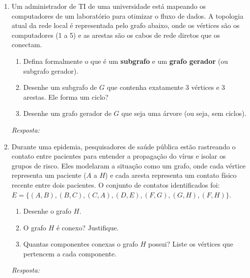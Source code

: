 \documentclass[12pt]{article}
\newcommand{\quadro}[1]{\vspace{0.2cm}\begin{tcolorbox}[colback=white, colframe=black, height=#1, boxrule=0.5pt, arc=0pt] \textit{Resposta:} \end{tcolorbox}}
\begin{document}
\begin{enumerate}[label=\arabic*), leftmargin=1.5cm, itemsep=0.8cm]

\item Um administrador de TI de uma universidade está mapeando os computadores de um laboratório para otimizar o fluxo de dados. A topologia atual da rede local é representada pelo grafo abaixo, onde os vértices são os computadores (1 a 5) e as arestas são os cabos de rede diretos que os conectam.
\begin{center}
\end{center}
\begin{enumerate}[label=\alph*)]
    \item Defina formalmente o que é um \textbf{subgrafo} e um \textbf{grafo gerador} (ou subgrafo gerador).
    \item Desenhe um subgrafo de $G$ que contenha exatamente 3 vértices e 3 arestas. Ele forma um ciclo?
    \item Desenhe um grafo gerador de $G$ que seja uma árvore (ou seja, sem ciclos).
\end{enumerate}
\quadro{8cm}

\item Durante uma epidemia, pesquisadores de saúde pública estão rastreando o contato entre pacientes para entender a propagação do vírus e isolar os grupos de risco. Eles modelaram a situação como um grafo, onde cada vértice representa um paciente ($A$ a $H$) e cada aresta representa um contato físico recente entre dois pacientes. O conjunto de contatos identificados foi: $E = \{(A,B), (B,C), (C,A), (D,E), (F,G), (G,H), (F,H)\}$.
\begin{enumerate}[label=\alph*)]
    \item Desenhe o grafo $H$.
    \item O grafo $H$ é conexo? Justifique.
    \item Quantas componentes conexas o grafo $H$ possui? Liste os vértices que pertencem a cada componente.
\end{enumerate}
\quadro{7cm}


\end{enumerate}
\end{document}
